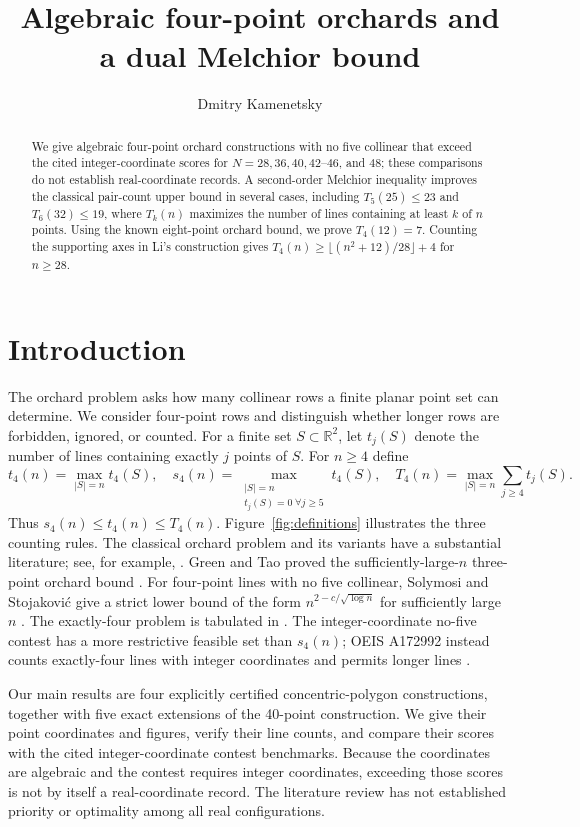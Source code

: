 \documentclass[11pt,a4paper]{amsart}
\title[Algebraic four-point orchards]{Algebraic four-point orchards and a dual Melchior bound}
\author{Dmitry Kamenetsky}
\theoremstyle{remark}\newtheorem{remark}[theorem]{Remark}
\newcommand{\R}{\mathbb R}
\begin{document}
\begin{abstract}
We give algebraic four-point orchard constructions with no five collinear that exceed the cited integer-coordinate scores for $N=28,36,40,42$--$46$, and $48$; these comparisons do not establish real-coordinate records. A second-order Melchior inequality improves the classical pair-count upper bound in several cases, including $T_5(25)\le23$ and $T_6(32)\le19$, where $T_k(n)$ maximizes the number of lines containing at least $k$ of $n$ points. Using the known eight-point orchard bound, we prove $T_4(12)=7$. Counting the supporting axes in Li's construction gives $T_4(n)\ge\lfloor(n^2+12)/28\rfloor+4$ for $n\ge28$.
\end{abstract}
\maketitle
\section{Introduction}
The orchard problem asks how many collinear rows a finite planar point set can determine. We consider four-point rows and distinguish whether longer rows are forbidden, ignored, or counted. For a finite set $S\subset\R^2$, let $t_j(S)$ denote the number of lines containing exactly $j$ points of $S$. For $n\ge4$ define
\[
 t_4(n)=\max_{|S|=n}t_4(S),\quad
 s_4(n)=\max_{\substack{|S|=n\\t_j(S)=0\;\forall j\ge5}}t_4(S),\quad
 T_4(n)=\max_{|S|=n}\sum_{j\ge4}t_j(S).
\]
Thus $s_4(n)\le t_4(n)\le T_4(n)$. Figure~\ref{fig:definitions} illustrates the three counting rules. The classical orchard problem and its variants have a substantial literature; see, for example, \cite{BGS,Elkies,Solymosi}. Green and Tao proved the sufficiently-large-$n$ three-point orchard bound \cite{GreenTao}. For four-point lines with no five collinear, Solymosi and Stojakovi\'c give a strict lower bound of the form $n^{2-c/\sqrt{\log n}}$ for sufficiently large $n$ \cite{Solymosi}. The exactly-four problem is tabulated in \cite{OEISreal,Du,MathWorld}. The integer-coordinate no-five contest \cite{Contest} has a more restrictive feasible set than $s_4(n)$; OEIS A172992 instead counts exactly-four lines with integer coordinates and permits longer lines \cite{OEISint}.

Our main results are four explicitly certified concentric-polygon constructions, together with five exact extensions of the 40-point construction. We give their point coordinates and figures, verify their line counts, and compare their scores with the cited integer-coordinate contest benchmarks. Because the coordinates are algebraic and the contest requires integer coordinates, exceeding those scores is not by itself a real-coordinate record. The literature review has not established priority or optimality among all real configurations.
\end{document}
